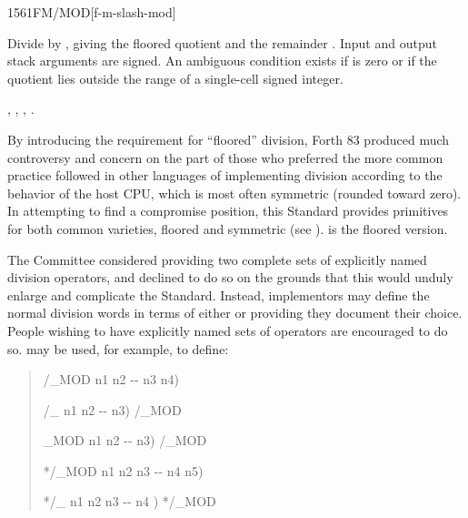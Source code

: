 \begin{worddef}{1561}{FM/MOD}[f-m-slash-mod]
\item {}

	Divide  by , giving the floored quotient
	 and the remainder . Input and output stack
	arguments are signed. An ambiguous condition exists if
	 is zero or if the quotient lies outside the range of
	a single-cell signed integer.

\see {},
	,
	,
	.

	\begin{rationale} %
		By introducing the requirement for ``floored'' division,
		Forth 83 produced much controversy and concern on the part of
		those who preferred the more common practice followed in other
		languages of implementing division according to the behavior
		of the host CPU, which is most often symmetric (rounded toward
		zero). In attempting to find a compromise position, this
		Standard provides primitives for both common varieties, floored
		and symmetric (see ).  is the floored
		version.

		The  Committee considered providing two complete sets
		of explicitly named division operators, and declined to do so
		on the grounds that this would unduly enlarge and complicate
		the Standard. Instead, implementors may define the normal
		division words in terms of either  or
		 providing they document their choice. People
		wishing to have explicitly named sets of operators are
		encouraged to do so.  may be used, for example,
		to define:

		\begin{quote}\ttfamily
			\word{:} /\_MOD  n1 n2 -{}- n3 n4)
				   
			\word{;}

			\word{:} /\_  n1 n2 -{}- n3)
				/\_MOD  
			\word{;}

			\word{:} \_MOD  n1 n2 -{}- n3)
				/\_MOD 
			\word{;}

			\word{:} */\_MOD  n1 n2 n3 -{}- n4 n5)
				   
			\word{;}

			\word{:} */\_  n1 n2 n3 -{}- n4 )
				*/\_MOD  
			\word{;}
		\end{quote}
	\end{rationale}


\end{worddef}
